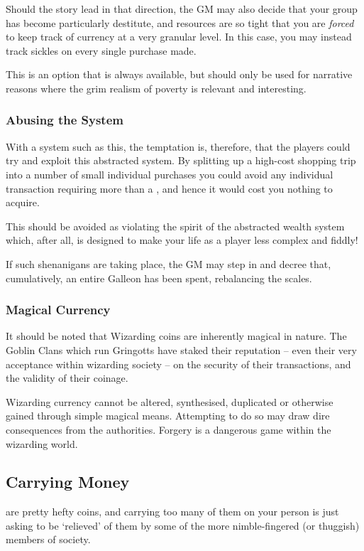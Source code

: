 Should the story lead in that direction, the GM may also decide that your group has become particularly destitute, and resources are so tight that you are {\it forced} to keep track of currency at a very granular level. In this case, you may instead track sickles on every single purchase made. 

This is an option that is always available, but should only be used for narrative reasons where the grim realism of poverty is relevant and interesting. 

\subsubsection{Abusing the System}

With a system such as this, the temptation is, therefore, that the players could try and exploit this abstracted system. By splitting up a high-cost shopping trip into a number of small individual purchases you could avoid any individual transaction requiring more than a , and hence it would cost you nothing to acquire.

This should be avoided as violating the spirit of the abstracted wealth system which, after all, is designed to make your life as a player less complex and fiddly!

If such shenanigans are taking place, the GM may step in and decree that, cumulatively, an entire Galleon has been spent, rebalancing the scales. 

\subsubsection{Magical Currency}

It should be noted that Wizarding coins are inherently magical in nature. The Goblin Clans which run Gringotts have staked their reputation -- even their very acceptance within wizarding society -- on the security of their transactions, and the validity of their coinage. 

Wizarding currency cannot be altered, synthesised, duplicated or otherwise gained through simple magical means. Attempting to do so may draw dire consequences from the authorities. Forgery is a dangerous game within the wizarding world.


\subsection{Carrying Money}

 are pretty hefty coins, and carrying too many of them on your person is just asking to be `relieved' of them by some of the more nimble-fingered (or thuggish) members of society. 


